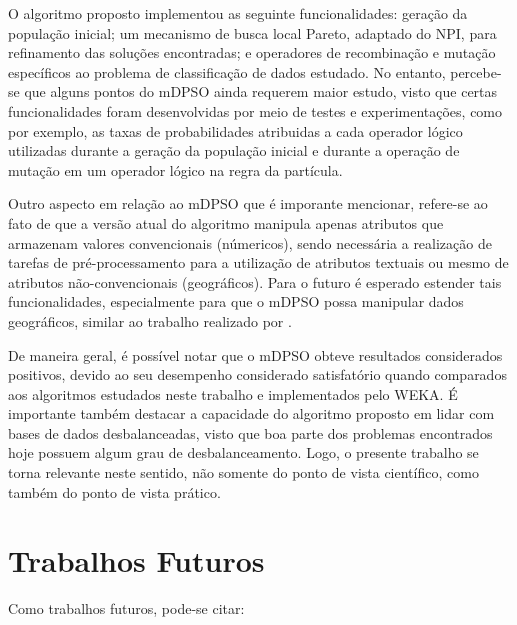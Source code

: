 \documentclass[
	12pt,				%
	openany,			%
	oneside,	
	a4paper,			%
	brazil,				%
	]{unimontes-ppgmsc-abntex2}
\begin{document}
O algoritmo proposto implementou as seguinte funcionalidades: geração da população inicial; um mecanismo de busca local Pareto, adaptado do NPI, para refinamento das soluções encontradas; e operadores de recombinação e mutação específicos ao problema de classificação de dados estudado. No entanto, percebe-se que alguns pontos do mDPSO ainda requerem maior estudo, visto que certas funcionalidades foram desenvolvidas por meio de testes e experimentações, como por exemplo, as taxas de probabilidades atribuidas a cada operador lógico utilizadas durante a geração da população inicial e durante a operação de mutação em um operador lógico na regra da partícula. 

Outro aspecto em relação ao mDPSO que é imporante mencionar, refere-se ao fato de que a versão atual do algoritmo manipula apenas atributos que armazenam valores convencionais (númericos), sendo necessária a realização de tarefas de pré-processamento para a utilização de atributos textuais ou mesmo de atributos não-convencionais (geográficos). Para o futuro é esperado estender tais funcionalidades, especialmente para que o mDPSO possa manipular dados geográficos, similar ao trabalho realizado por .

De maneira geral, é possível notar que o mDPSO obteve resultados considerados positivos, devido ao seu desempenho considerado satisfatório quando comparados aos algoritmos estudados neste trabalho e implementados pelo WEKA. É importante também destacar a capacidade do algoritmo proposto em lidar com bases de dados desbalanceadas, visto que boa parte dos problemas encontrados hoje possuem algum grau de desbalanceamento. Logo, o presente trabalho se torna relevante neste sentido, não somente do ponto de vista científico, como também do ponto de vista prático.

\section{Trabalhos Futuros}

Como trabalhos futuros, pode-se citar:
\end{document}
